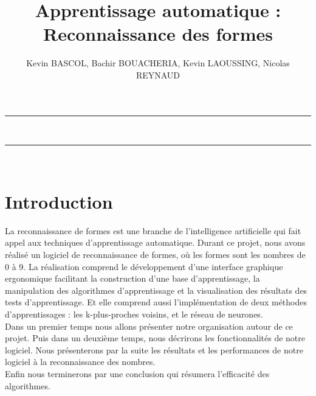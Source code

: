 \documentclass[10pt,a4paper]{report}
\author{Kevin BASCOL, Bachir BOUACHERIA, Kevin LAOUSSING, Nicolas REYNAUD}
\title{ Apprentissage automatique : Reconnaissance des formes}
\begin{document}
\makeatletter
	\begin{titlepage}
	
	\centering
		{
		\vspace*{5cm}
		\hrule height 2pt
		\vspace{0.7cm}
		\Huge \textbf{\@title}}\\
		\vspace{0.7cm}
		\hrule height 2pt
		
		\vfill
		\vspace{1cm}
		\@author\\
		\end{titlepage}
\makeatother
\setcounter{secnumdepth}{4}
\setcounter{tocdepth}{3}
\renewcommand{\contentsname}{Sommaire}
\begingroup\makeatletter
\def\@makeschapterhead#1{%
  {\parindent \z@ \raggedright
    \normalfont
    \interlinepenalty\@M
    \Huge \bfseries  #1\par\nobreak
    \vskip 20pt%
  }}\makeatother
\tableofcontents
\endgroup
\thispagestyle{empty}
\setcounter{page}{0}
\newpage


\section{Introduction}
\begin{flushleft}

La reconnaissance de formes est une branche de l'intelligence artificielle qui fait appel aux techniques d'apprentissage automatique. Durant ce projet, nous avons réalisé un logiciel de reconnaissance de formes, où les formes sont les nombres de 0 à 9.
La réalisation comprend le développement d'une interface graphique ergonomique facilitant la construction d'une base d'apprentissage, la manipulation des algorithmes d'apprentissage et la visualisation des résultats des tests d'apprentissage. Et elle comprend aussi l'implémentation de deux méthodes d'apprentissages : les k-plus-proches voisins, et le réseau de neurones.\\
Dans un premier temps nous allons présenter notre organisation autour de ce projet. Puis dans un deuxième temps, nous décrirons les fonctionnalités de notre logiciel. Nous présenterons par la suite les résultats et les performances de notre logiciel à la reconnaissance des nombres.\\
Enfin nous terminerons par une conclusion qui résumera l'efficacité des algorithmes.


\end{flushleft}
\end{document}
